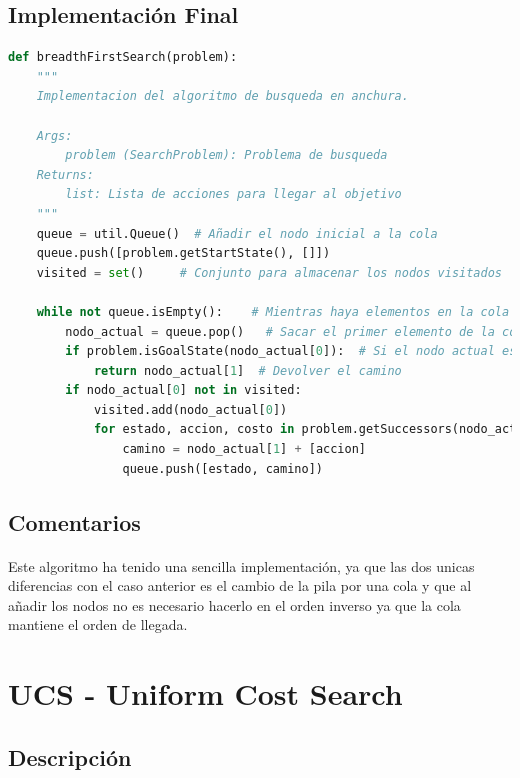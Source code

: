 \documentclass{report}
\begin{document}
        \subsection*{Implementación Final}
          \begin{lstlisting}[language=Python, caption=Implementación final del BFS]
  def breadthFirstSearch(problem):
    """
    Implementacion del algoritmo de busqueda en anchura.

    Args:
        problem (SearchProblem): Problema de busqueda
    Returns:
        list: Lista de acciones para llegar al objetivo
    """
    queue = util.Queue()  # Añadir el nodo inicial a la cola
    queue.push([problem.getStartState(), []])
    visited = set()     # Conjunto para almacenar los nodos visitados

    while not queue.isEmpty():    # Mientras haya elementos en la cola
        nodo_actual = queue.pop()   # Sacar el primer elemento de la cola
        if problem.isGoalState(nodo_actual[0]):  # Si el nodo actual es el objetivo
            return nodo_actual[1]  # Devolver el camino
        if nodo_actual[0] not in visited:
            visited.add(nodo_actual[0])
            for estado, accion, costo in problem.getSuccessors(nodo_actual[0]): # Añadir los hijos del nodo actual a la cola
                camino = nodo_actual[1] + [accion]
                queue.push([estado, camino])
          \end{lstlisting}
        \subsection*{Comentarios}
          \paragraph*{}{
            Este algoritmo ha tenido una sencilla implementación, ya que las dos unicas diferencias con el caso anterior es el cambio de la pila por una cola y que al añadir los nodos no es necesario hacerlo en el orden inverso ya que la cola mantiene el orden de llegada.\\
          }
      \clearpage\section{UCS - Uniform Cost Search}
        \subsection*{Descripción}
\end{document}

